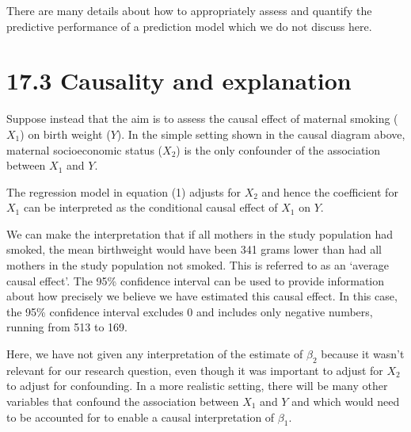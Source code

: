 \documentclass[letterpaper,10pt,english]{jupyterBook}
\begin{document}
\sphinxAtStartPar
There are many details about how to appropriately assess and quantify the predictive performance of a prediction model which we do not discuss here.


\section{17.3 Causality and explanation}
\label{\detokenize{17. Investigations round up:causality-and-explanation}}
\sphinxAtStartPar
Suppose instead that the aim is to assess the causal effect of maternal smoking (\(X_{1}\)) on birth weight (\(Y\)). In the simple setting shown in the causal diagram above, maternal socioeconomic status (\(X_{2}\)) is the only confounder of the association between \(X_{1}\) and \(Y\).

\sphinxAtStartPar
The regression model in equation (1) adjusts for \(X_{2}\) and hence the coefficient for \(X_{1}\) can be interpreted as the conditional causal effect of \(X_{1}\) on \(Y\).

\sphinxAtStartPar
We can make the interpretation that if all mothers in the study population had smoked, the mean birthweight would have been 341 grams lower than had all mothers in the study population not smoked. This is referred to as an ‘average causal effect’. The 95\% confidence interval can be used to provide information about how precisely we believe we have estimated this causal effect. In this case, the 95\% confidence interval excludes 0 and includes only negative numbers, running from \sphinxhyphen{}513 to \sphinxhyphen{}169.

\sphinxAtStartPar
Here, we have not given any interpretation of the estimate of \(\beta_{2}\) because it wasn’t relevant for our research question, even though it was important to adjust for \(X_{2}\) to adjust for confounding. In a more realistic setting, there will be many other variables that confound the association between \(X_{1}\) and \(Y\) and which would need to be accounted for to enable a causal interpretation of \(\beta_{1}\).
\end{document}
